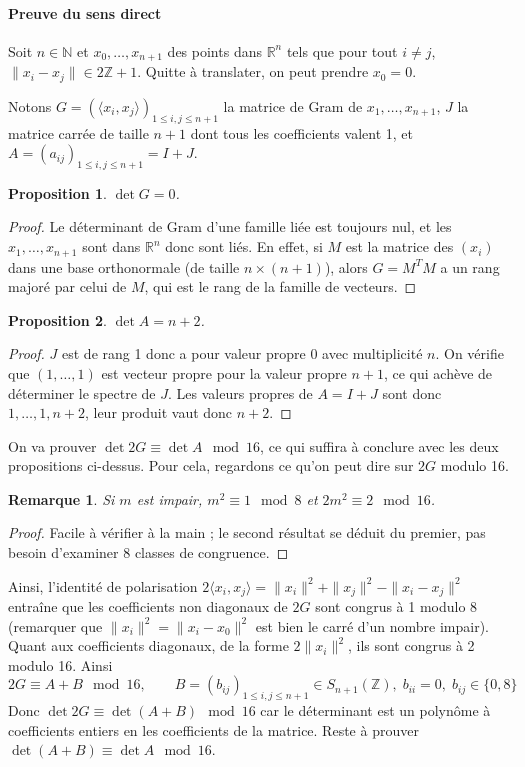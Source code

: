 \documentclass[a4paper, 11pt]{article}
\def\Z{\mathbb{Z}}
\def\N{\mathbb{N}}
\def\R{\mathbb{R}}
\newtheorem*{proposition}{Proposition}
\newtheorem*{remark}{Remarque}
\begin{document}
\paragraph{Preuve du sens direct}

Soit $n \in \N$ et $x_0, \ldots, x_{n+1}$ des points dans $\R^n$ tels que pour
tout $i \neq j$, $\|x_i - x_j\| \in 2\Z + 1$. Quitte à translater, on peut
prendre $x_0 = 0$.

Notons $G = (\langle x_i, x_j \rangle)_{1 \leq i,j \leq n+1}$ la matrice de Gram
de $x_1, \ldots, x_{n+1}$, $J$ la matrice carrée de taille $n+1$ dont tous les
coefficients valent 1, et $A = (a_{ij})_{1 \leq i,j \leq n+1} = I+J$.

\begin{proposition}
  $\det G = 0$.
\end{proposition}
\begin{proof}
  Le déterminant de Gram d'une famille liée est toujours nul, et les $x_1,
  \ldots, x_{n+1}$ sont dans $\R^n$ donc sont liés. En effet, si $M$ est la
  matrice des $(x_i)$ dans une base orthonormale (de taille $n \times (n+1)$),
  alors $G = M^T M$ a un rang majoré par celui de $M$, qui est le rang de la
  famille de vecteurs.
\end{proof}

\begin{proposition}
  $\det A = n+2$.
\end{proposition}
\begin{proof}
  $J$ est de rang 1 donc a pour valeur propre 0 avec multiplicité $n$. On
  vérifie que $(1,\ldots,1)$ est vecteur propre pour la valeur propre $n+1$, ce
  qui achève de déterminer le spectre de $J$. Les valeurs propres de $A = I+J$
  sont donc $1, \ldots, 1, n+2$, leur produit vaut donc $n+2$.
\end{proof}

On va prouver $\det 2G \equiv \det A \mod 16$, ce qui suffira à conclure avec
les deux propositions ci-dessus. Pour cela, regardons ce qu'on peut dire sur
$2G$ modulo 16.

\begin{remark}
  Si $m$ est impair, $m^2 \equiv 1 \mod 8$ et $2m^2 \equiv 2 \mod 16$.
\end{remark}
\begin{proof}
  Facile à vérifier à la main ; le second résultat se déduit du premier, pas
  besoin d'examiner 8 classes de congruence.
\end{proof}

Ainsi, l'identité de polarisation $2 \langle x_i, x_j \rangle = \|x_i\|^2 +
\|x_j\|^2 - \|x_i - x_j\|^2$ entraîne que les coefficients non diagonaux de $2G$
sont congrus à 1 modulo 8 (remarquer que $\|x_i\|^2 = \|x_i - x_0\|^2$ est bien
le carré d'un nombre impair). Quant aux coefficients diagonaux, de la forme
$2\|x_i\|^2$, ils sont congrus à 2 modulo 16. Ainsi
\[ 2G \equiv A + B \mod 16, \qquad B = (b_{ij})_{1 \leq i,j \leq n+1} \in
  S_{n+1}(\Z),\; b_{ii} = 0,\; b_{ij} \in \{0,8\} \]
Donc $\det 2G \equiv \det(A+B) \mod 16$ car le déterminant est un polynôme à
coefficients entiers en les coefficients de la matrice. Reste à prouver
$\det(A+B) \equiv \det A \mod 16$.
\end{document}
